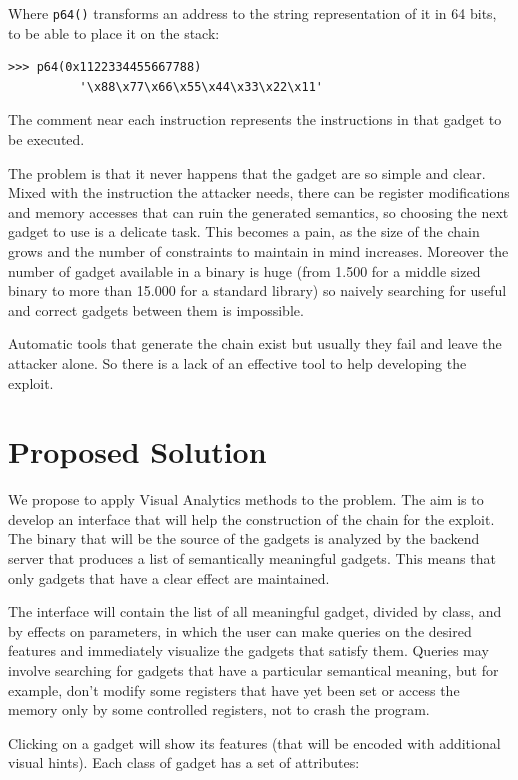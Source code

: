 \documentclass[11pt]{article}
\begin{document}
\bigskip
Where \texttt{p64()} transforms an address to the string representation of it in 64 bits, to be able to place it on the stack:
\begin{lstlisting}
>>> p64(0x1122334455667788)
          '\x88\x77\x66\x55\x44\x33\x22\x11'
\end{lstlisting}

The comment near each instruction represents the instructions in that gadget to be executed.

\bigskip
The problem is that it never happens that the gadget are so simple and clear. Mixed with the instruction the attacker needs, there can be register modifications and memory accesses that can ruin the generated semantics, so choosing the next gadget to use is a delicate task. This becomes a pain, as the size of the chain grows and the number of constraints to maintain in mind increases.
Moreover the number of gadget available in a binary is huge (from 1.500 for a middle sized binary to more than 15.000 for a standard library) so naively searching for useful and correct gadgets between them is impossible.

 Automatic tools that generate the chain exist but usually they fail and leave the attacker alone. So there is a lack of an effective tool to help developing the exploit.

\section{Proposed Solution}

We propose to apply Visual Analytics methods to the problem. The aim is to develop an interface that will help the construction of the chain for the exploit.
The binary that will be the source of the gadgets is analyzed by the backend server that produces a list of semantically meaningful gadgets. This means that only gadgets that have a clear effect are maintained.

The interface will contain the list of all meaningful gadget, divided by class, and by effects on parameters, in which the user can make queries on the desired features and immediately visualize the gadgets that satisfy them.
Queries may involve searching for gadgets that have a particular semantical meaning, but for example, don't modify some registers that have yet been set or access the memory only by some controlled registers, not to crash the program.

Clicking on a gadget will show its features (that will be encoded with additional visual hints). Each class of gadget has a set of attributes:
\end{document}
